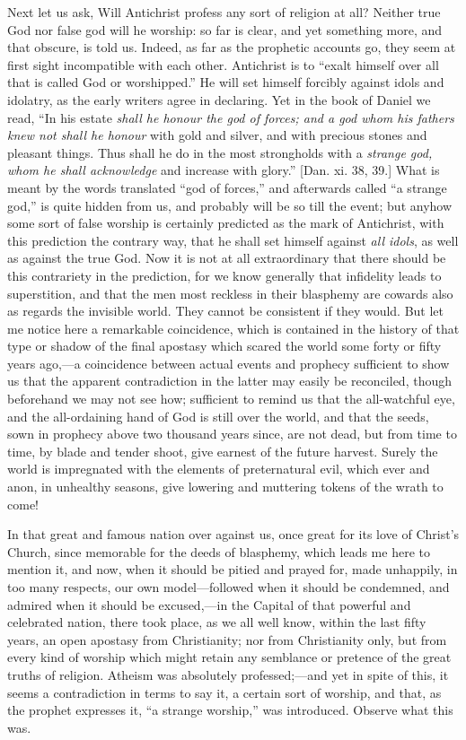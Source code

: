 Next let us ask, Will Antichrist profess any sort of religion at
all? Neither true God nor false god will he worship: so far is clear,
and yet something more, and that obscure, is told us. Indeed, as
far as the prophetic accounts go, they seem at first sight
incompatible with each other. Antichrist is to ``exalt himself
over all that is called God or worshipped.'' He will set himself
forcibly against idols and idolatry, as the early writers agree in
declaring. Yet in the book of Daniel we read, ``In his estate \emph{shall
he honour the god of forces; and a god whom his fathers knew not shall
he honour} with gold and silver, and with precious stones and
pleasant things. Thus shall he do in the most strongholds with a \emph{strange
god, whom he shall acknowledge} and increase with glory.''
[Dan. xi. 38, 39.] What is meant by the words translated ``god of
forces,'' and afterwards called ``a strange god,'' is
quite hidden from us, and probably will be so till the event; but
anyhow some sort of false worship is certainly predicted as the mark
of Antichrist, with this prediction the contrary way, that he shall
set himself against \emph{all idols}, as well as against the true God.
Now it is not at all extraordinary that there should be this
contrariety in the prediction, for we know generally that infidelity
leads to superstition, and that the men most reckless in their
blasphemy are cowards also as regards the invisible world. They cannot
be consistent if they would. But let me notice here a remarkable
coincidence, which is contained in the history of that type or shadow
of the final apostasy which scared the world some forty or fifty years
ago,—a coincidence between actual events and prophecy sufficient to
show us that the apparent contradiction in the latter may easily be
reconciled, though beforehand we may not see how; sufficient to remind
us that the all-watchful eye, and the all-ordaining hand of God is
still over the world, and that the seeds, sown in prophecy above two
thousand years since, are not dead, but from time to time, by
blade and tender shoot, give earnest of the future harvest. Surely the
world is impregnated with the elements of preternatural evil, which
ever and anon, in unhealthy seasons, give lowering and muttering
tokens of the wrath to come!

In that great and famous nation over against us, once great for its
love of Christ's Church, since memorable for the deeds of blasphemy,
which leads me here to mention it, and now, when it should be pitied
and prayed for, made unhappily, in too many respects, our own model—followed
when it should be condemned, and admired when it should be excused,—in
the Capital of that powerful and celebrated nation, there took place,
as we all well know, within the last fifty years, an open apostasy
from Christianity; nor from Christianity only, but from every kind of
worship which might retain any semblance or pretence of the great
truths of religion. Atheism was absolutely professed;—and yet in
spite of this, it seems a contradiction in terms to say it, a certain
sort of worship, and that, as the prophet expresses it, ``a
strange worship,'' was introduced. Observe what this was.

